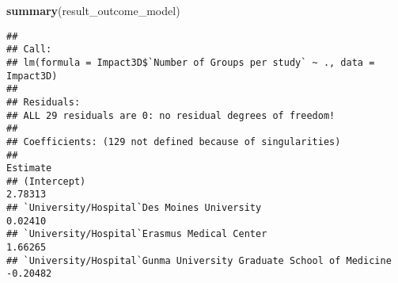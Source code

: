 \documentclass[]{article}
\newenvironment{Shaded}{\begin{snugshade}}{\end{snugshade}}
\newcommand{\KeywordTok}[1]{\textcolor[rgb]{0.13,0.29,0.53}{\textbf{#1}}}
\newcommand{\NormalTok}[1]{#1}
\begin{document}
\begin{Shaded}
\begin{Highlighting}[]
\KeywordTok{summary}\NormalTok{(result_outcome_model)}
\end{Highlighting}
\end{Shaded}

\begin{verbatim}
## 
## Call:
## lm(formula = Impact3D$`Number of Groups per study` ~ ., data = Impact3D)
## 
## Residuals:
## ALL 29 residuals are 0: no residual degrees of freedom!
## 
## Coefficients: (129 not defined because of singularities)
##                                                                                                                                                                                                                                                                                                                                                                                                                                                                                 Estimate
## (Intercept)                                                                                                                                                                                                                                                                                                                                                                                                                                                                      2.78313
## `University/Hospital`Des Moines University                                                                                                                                                                                                                                                                                                                                                                                                                                       0.02410
## `University/Hospital`Erasmus Medical Center                                                                                                                                                                                                                                                                                                                                                                                                                                      1.66265
## `University/Hospital`Gunma University Graduate School of Medicine                                                                                                                                                                                                                                                                                                                                                                                                               -0.20482

\end{verbatim}
\end{document}
